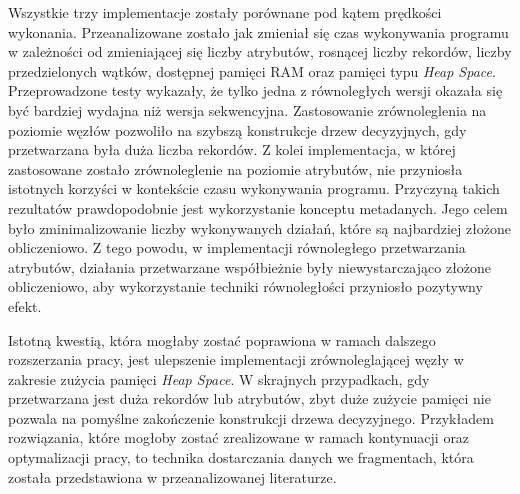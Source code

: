 \documentclass[12pt]{article}
\begin{document}
Wszystkie trzy implementacje zostały porównane pod kątem prędkości wykonania.
Przeanalizowane zostało jak zmieniał się czas wykonywania programu w zależności od zmieniającej się liczby atrybutów,
rosnącej liczby rekordów, liczby przedzielonych wątków, dostępnej pamięci RAM oraz pamięci typu \textit{Heap Space}.
Przeprowadzone testy wykazały, że tylko jedna z równoległych wersji okazała
się być bardziej wydajna niż wersja sekwencyjna. Zastosowanie zrównoleglenia
na poziomie węzłów pozwoliło na szybszą konstrukcje drzew decyzyjnych, gdy przetwarzana była duża liczba rekordów.
Z kolei implementacja, w której zastosowane zostało zrównoleglenie 
na poziomie atrybutów, nie przyniosła istotnych korzyści w kontekście czasu wykonywania programu.
Przyczyną takich rezultatów prawdopodobnie jest wykorzystanie konceptu metadanych.
Jego celem było zminimalizowanie liczby wykonywanych działań, które są najbardziej złożone obliczeniowo.
Z tego powodu, w implementacji równoległego przetwarzania atrybutów, działania przetwarzane współbieżnie
były niewystarczająco złożone obliczeniowo, aby wykorzystanie techniki równoległości przyniosło pozytywny efekt.

Istotną kwestią, która mogłaby zostać poprawiona w ramach dalszego rozszerzania pracy, jest ulepszenie implementacji zrównoleglającej węzły
w zakresie zużycia pamięci \textit{Heap Space}. W skrajnych przypadkach, gdy przetwarzana jest duża rekordów lub atrybutów,
zbyt duże zużycie pamięci nie pozwala na pomyślne zakończenie konstrukcji drzewa decyzyjnego. Przykładem rozwiązania, które
mogłoby zostać zrealizowane w ramach kontynuacji oraz optymalizacji pracy, to technika dostarczania danych
we fragmentach, która została przedstawiona w przeanalizowanej literaturze.
\newpage

\cleardoublepage
{}
{}
\listoftables

\listoffigures

\lstlistoflistings

\newpage
\end{document}
